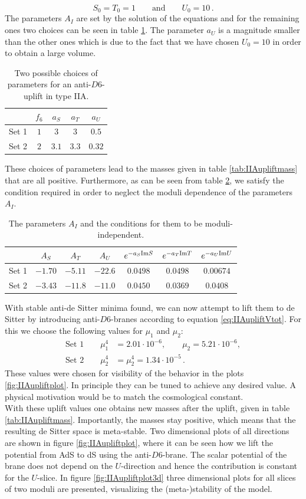 \documentclass[a4paper,12pt]{report}
\newcommand{\be}{\begin{equation}}
\newcommand{\ee}{\end{equation}}
\newcommand{\bea}{\begin{equation}\begin{aligned}}
\newcommand{\eea}{\end{aligned}\end{equation}}
\begin{document}
\be 
S_0 = T_0=1 \qquad \text{and}\qquad U_0=10\,.
\ee
The parameters $A_I$ are set by the solution of the equations and for the remaining ones two choices can be seen in table \ref{tab:IIAupliftpar}. The parameter $a_U$ is a magnitude smaller than the other ones which is due to the fact that we have chosen $U_0=10$ in order to obtain a large volume.
\begin{table}[H]
\center
\begin{tabular}{|c|c|c|c|c|}\hline
 & $f_6$ & $a_S$ & $a_T$ & $a_U$ \\\hline
Set 1 & $1$ & $3$ & $3$ & $0.5$ \\\hline
Set 2 &$2$ & $3.1$ & $3.3$ & $0.32$ \\\hline
\end{tabular}
\caption{Two possible choices of parameters for an anti-$D6$-uplift in type IIA.}
\label{tab:IIAupliftpar}
\end{table}
These choices of parameters lead to the masses given in table \ref{tab:IIAupliftmass} that are all positive. Furthermore, as can be seen from table \ref{tab:IIAupliftreq}, we satisfy the condition required in order to neglect the moduli dependence of the parameters $A_I$.
\begin{table}[H]
\center
\begin{tabular}{|c|c|c|c||c|c|c|}\hline
 & $A_S$ & $A_T$ & $A_U$  & $e^{-a_S {\rm Im} S}$ & $e^{-a_T {\rm Im} T}$ & $e^{-a_U {\rm Im} U}$  \\\hline
Set 1 & $-1.70$ & $-5.11$ & $-22.6$ & $0.0498$ & $0.0498$ & $0.00674$  \\\hline
Set 2 & $-3.43$ & $-11.8$ & $-11.0$ & $0.0450$ & $0.0369$ & $0.0408$  \\\hline
\end{tabular}
\caption{The parameters $A_I$ and the conditions for them to be moduli-independent.}
\label{tab:IIAupliftreq}
\end{table}
With stable anti-de Sitter minima found, we can now attempt to lift them to de Sitter by introducing anti-$D6$-branes according to equation \eqref{eq:IIAupliftVtot}. For this we choose the following values for $\mu_1$ and $\mu_2$:
\bea 
\text{Set 1} \qquad \mu_1^4 &= 2.01 \cdot 10^{-6}, \qquad \mu_2 = 5.21 \cdot 10^{-6},\\
\text{Set 2} \qquad \mu_2^4 &= \mu_2^4 = 1.34 \cdot 10^{-5}\,.
\eea
These values were chosen for visibility of the behavior in the plots \ref{fig:IIAupliftplot}. In principle they can be tuned to achieve any desired value. A physical motivation would be to match the cosmological constant.\\
With these uplift values one obtains new masses after the uplift, given in table \ref{tab:IIAupliftmass}. Importantly, the masses stay positive, which means that the resulting de Sitter space is meta-stable. Two dimensional plots of all directions are shown in figure \ref{fig:IIAupliftplot}, where it can be seen how we lift the potential from AdS to dS using the anti-$D6$-brane. The scalar potential of the brane does not depend on the $U$-direction and hence the contribution is constant for the $U$-slice. In figure \ref{fig:IIAupliftplot3d} three dimensional plots for all slices of two moduli are presented, visualizing the (meta-)stability of the model. 
\end{document}
